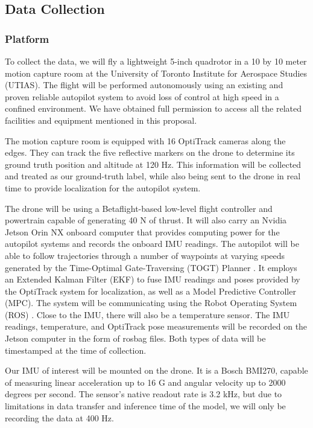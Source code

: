 \documentclass{article} %
\begin{document}
\subsection{Data Collection}

\subsubsection{Platform}

To collect the data, we will fly a lightweight 5-inch quadrotor in a 10 by 10 meter motion capture room at the University of Toronto Institute for Aerospace Studies (UTIAS). The flight will be performed autonomously using an existing and proven reliable autopilot system to avoid loss of control at high speed in a confined environment. We have obtained full permission to access all the related facilities and equipment mentioned in this proposal.

The motion capture room is equipped with 16 OptiTrack cameras along the edges. They can track the five reflective markers on the drone to determine its ground truth position and altitude at 120 Hz. This information will be collected and treated as our ground-truth label, while also being sent to the drone in real time to provide localization for the autopilot system.

The drone will be using a Betaflight-based low-level flight controller and powertrain capable of generating 40 N of thrust. It will also carry an Nvidia Jetson Orin NX onboard computer that provides computing power for the autopilot systems and records the onboard IMU readings. The autopilot will be able to follow trajectories through a number of waypoints at varying speeds generated by the Time-Optimal Gate-Traversing (TOGT) Planner \citep{ICRA2024CQ}. It employs an Extended Kalman Filter (EKF) to fuse IMU readings and poses provided by the OptiTrack system for localization, as well as a Model Predictive Controller (MPC). The system will be communicating using the Robot Operating System (ROS) \citep{Quigley09}. Close to the IMU, there will also be a temperature sensor. The IMU readings, temperature, and OptiTrack pose measurements will be recorded on the Jetson computer in the form of rosbag files. Both types of data will be timestamped at the time of collection.

Our IMU of interest will be mounted on the drone. It is a Bosch BMI270, capable of measuring linear acceleration up to 16 G and angular velocity up to 2000 degrees per second. The sensor's native readout rate is 3.2 kHz, but due to limitations in data transfer and inference time of the model, we will only be recording the data at 400 Hz.
\end{document}
